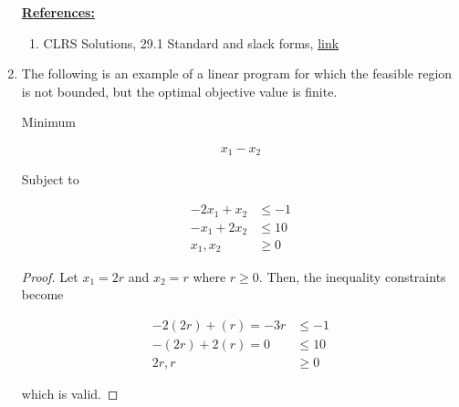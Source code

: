 \documentclass[12pt]{article}
\begin{document}
\begin{enumerate}[1.]





    \underline{\textbf{References:}}

    \bigskip

    \begin{enumerate}[1)]
        \item CLRS Solutions, 29.1 Standard and slack forms, \href{https://walkccc.github.io/CLRS/Chap29/29.1/}{link}
    \end{enumerate}

    \item

    The following is an example of a linear program for which the feasible region
    is not bounded, but the optimal objective value is finite.

    \bigskip

    Minimum

    \begin{align*}
        x_1 - x_2
    \end{align*}

    Subject to

    \begin{align*}
        -2x_1 + x_2 &\leq -1\\
        -x_1 + 2x_2 &\leq 10\\
        x_1,x_2 &\geq 0
    \end{align*}

    \begin{proof}

    Let $x_1 = 2r$ and $x_2 = r$ where $r \geq 0$. Then, the inequality constraints become


    \begin{align}
        -2(2r) + (r) = -3r &\leq -1\\
        -(2r) + 2(r) = 0 &\leq 10\\
        2r, r &\geq 0
    \end{align}

    which is valid.


\end{proof}
\end{enumerate}
\end{document}
